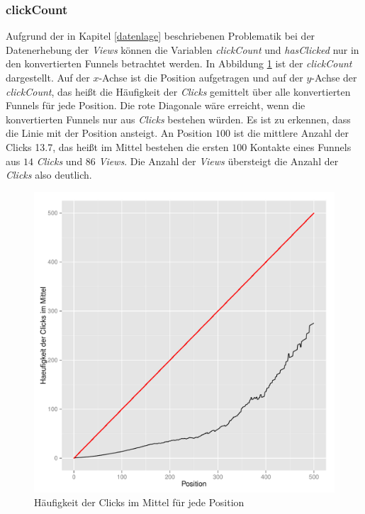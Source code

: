 \subsubsection*{clickCount}
Aufgrund der in Kapitel \ref{datenlage} beschriebenen Problematik bei der Datenerhebung der \textit{Views} können die Variablen \textit{clickCount} und \textit{hasClicked} nur in den konvertierten Funnels betrachtet werden. In Abbildung \ref{clickCount} ist der \textit{clickCount} dargestellt. Auf der $x$-Achse ist die Position aufgetragen und auf der $y$-Achse der \textit{clickCount}, das heißt die Häufigkeit der \textit{Clicks} gemittelt über alle konvertierten Funnels für jede Position. Die rote Diagonale wäre erreicht, wenn die konvertierten Funnels nur aus \textit{Clicks} bestehen würden. Es ist zu erkennen, dass die Linie mit der Position ansteigt. An Position $100$ ist die mittlere Anzahl der Clicks 13.7, das heißt im Mittel bestehen die ersten $100$ Kontakte eines Funnels aus $14$ \textit{Clicks} und $86$ \textit{Views}. Die Anzahl der \textit{Views} übersteigt die Anzahl der \textit{Clicks} also deutlich.\\
\begin{figure}[H]
    \centering
    \includegraphics[scale=0.3]{clickCountSucc.pdf}
    \caption[Häufigkeit der Clicks im Mittel]{Häufigkeit der Clicks im Mittel für jede Position}
    \label{clickCount}
\end{figure}

